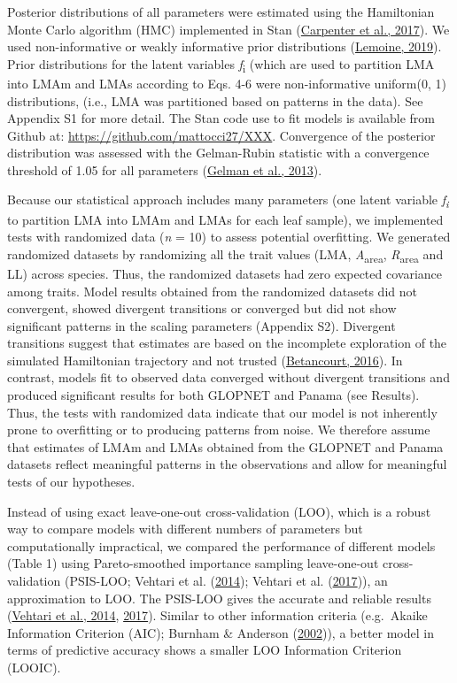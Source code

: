 \documentclass[
  12pt,
  a4paper,
,tablecaptionabove
]{scrartcl}
\begin{document}
Posterior distributions of all parameters were estimated using the
Hamiltonian Monte Carlo algorithm (HMC) implemented in Stan
(\protect\hyperlink{ref-Carpenter2017}{Carpenter et al., 2017}). We used
non-informative or weakly informative prior distributions
(\protect\hyperlink{ref-Lemoine2019}{Lemoine, 2019}). Prior
distributions for the latent variables \emph{f}\textsubscript{i} (which
are used to partition LMA into LMAm and LMAs according to Eqs. 4-6 were
non-informative uniform(0, 1) distributions, (i.e., LMA was partitioned
based on patterns in the data). See Appendix S1 for more detail. The
Stan code use to fit models is available from Github at:
\href{https://github.com/mattocci27/xxx}{https://github.com/mattocci27/XXX}.
Convergence of the posterior distribution was assessed with the
Gelman-Rubin statistic with a convergence threshold of 1.05 for all
parameters (\protect\hyperlink{ref-Gelman2013}{Gelman et al., 2013}).

Because our statistical approach includes many parameters (one latent
variable \emph{f\textsubscript{i}} to partition LMA into LMAm and LMAs
for each leaf sample), we implemented tests with randomized data
(\emph{n} = 10) to assess potential overfitting. We generated randomized
datasets by randomizing all the trait values (LMA,
\emph{A}\textsubscript{area}, \emph{R}\textsubscript{area} and LL)
across species. Thus, the randomized datasets had zero expected
covariance among traits. Model results obtained from the randomized
datasets did not convergent, showed divergent transitions or converged
but did not show significant patterns in the scaling parameters
(Appendix S2). Divergent transitions suggest that estimates are based on
the incomplete exploration of the simulated Hamiltonian trajectory and
not trusted (\protect\hyperlink{ref-Betancourt2016}{Betancourt, 2016}).
In contrast, models fit to observed data converged without divergent
transitions and produced significant results for both GLOPNET and Panama
(see Results). Thus, the tests with randomized data indicate that our
model is not inherently prone to overfitting or to producing patterns
from noise. We therefore assume that estimates of LMAm and LMAs obtained
from the GLOPNET and Panama datasets reflect meaningful patterns in the
observations and allow for meaningful tests of our hypotheses.

Instead of using exact leave-one-out cross-validation (LOO), which is a
robust way to compare models with different numbers of parameters but
computationally impractical, we compared the performance of different
models (Table 1) using Pareto-smoothed importance sampling leave-one-out
cross-validation (PSIS-LOO; Vehtari et al.
(\protect\hyperlink{ref-Vehtari2014}{2014}); Vehtari et al.
(\protect\hyperlink{ref-Vehtari2017}{2017})), an approximation to LOO.
The PSIS-LOO gives the accurate and reliable results
(\protect\hyperlink{ref-Vehtari2014}{Vehtari et al., 2014},
\protect\hyperlink{ref-Vehtari2017}{2017}). Similar to other information
criteria (e.g.~Akaike Information Criterion (AIC); Burnham \& Anderson
(\protect\hyperlink{ref-Burnham2002}{2002})), a better model in terms of
predictive accuracy shows a smaller LOO Information Criterion (LOOIC).
\end{document}
